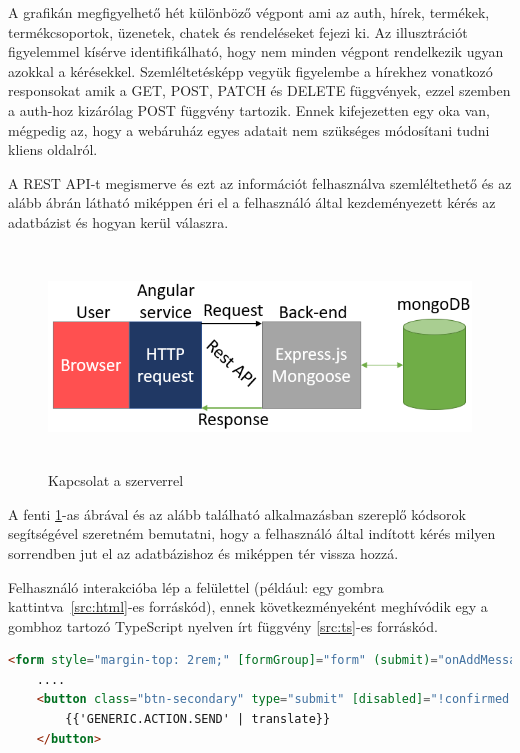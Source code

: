  A grafikán megfigyelhető hét különböző végpont ami az auth, hírek, termékek, termékcsoportok, üzenetek, chatek és rendeléseket fejezi ki. Az illusztrációt figyelemmel kísérve identifikálható, hogy nem minden végpont rendelkezik ugyan azokkal a kérésekkel. Szemléltetésképp vegyük figyelembe a hírekhez vonatkozó responsokat amik a GET, POST, PATCH és DELETE függvények, ezzel szemben a auth-hoz kizárólag POST függvény tartozik. Ennek kifejezetten egy oka van, mégpedig az, hogy a webáruház egyes adatait nem szükséges módosítani tudni kliens oldalról.

\bigskip
A REST API-t megismerve és ezt az információt felhasználva szemléltethető és az alább ábrán látható miképpen éri el a felhasználó által kezdeményezett kérés az adatbázist és hogyan kerül válaszra.

\begin{figure}[H]
	\centering
	\includegraphics[width=1.0\textwidth,height=220px]{images/kapcsolat_szerver_bemutatas.png}
	\caption{Kapcsolat a szerverrel}
	\label{fig.picture-8}
\end{figure}

A fenti \ref{fig.picture-8}-as ábrával és az alább található alkalmazásban szereplő kódsorok segítségével szeretném bemutatni, hogy a felhasználó által indított kérés milyen sorrendben jut el az adatbázishoz és miképpen tér vissza hozzá.

\bigskip
Felhasználó interakcióba lép a felülettel (például: egy gombra kattintva~\ref{src:html}-es forráskód), ennek következményeként meghívódik egy a gombhoz tartozó TypeScript nyelven írt függvény \ref{src:ts}-es forráskód.

\begin{lstlisting}[language=html]
	<form style="margin-top: 2rem;" [formGroup]="form" (submit)="onAddMessage()" *ngIf="!isLoading">
	....
	<button class="btn-secondary" type="submit" [disabled]="!confirmed.checked">
		{{'GENERIC.ACTION.SEND' | translate}}
	</button>
\end{lstlisting}

